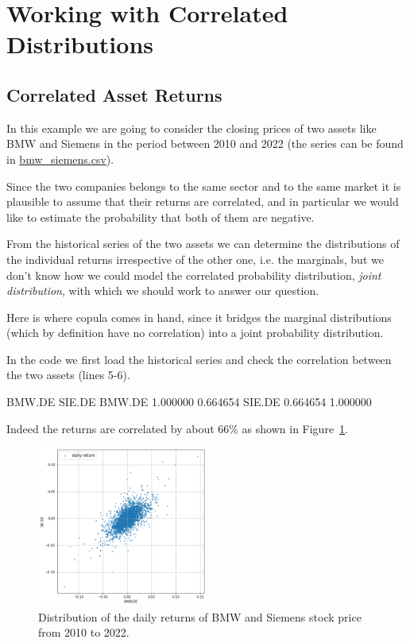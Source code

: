 \section{Working with Correlated Distributions}
\label{sec:generate-correlated-distributions}

\subsection{Correlated Asset Returns}
\label{sec:correlated_stock_returns}

In this example we are going to consider the closing prices of two assets like BMW and Siemens in the period between 2010 and 2022 (the series can be found in \href{https://github.com/matteosan1/finance_course/raw/master/input_files/bmw_siemens.csv}{bmw\_siemens.csv}).

Since the two companies belongs to the same sector and to the same market it is plausible to assume that their returns are correlated, and in particular we would like to estimate the probability that both of them are negative.

From the historical series of the two assets we can determine the distributions of the individual returns irrespective of the other one, i.e. the marginals, but we don't know how we could model the correlated probability distribution, \emph{joint distribution}, with which we should work to answer our question. 

Here is where copula comes in hand, since it bridges the marginal distributions (which by definition have no correlation) into a joint probability distribution. 


In the code we first load the historical series and check the correlation between the two assets (lines 5-6).
\begin{ioutput}
          BMW.DE    SIE.DE
BMW.DE  1.000000  0.664654
SIE.DE  0.664654  1.000000
\end{ioutput}
Indeed the returns are correlated by about 66\% as shown in Figure~\ref{fig:bmw_sie_returns}.

\begin{figure}[htbp]
\centering
\includegraphics[width=0.5\textwidth]{figures/bmw_sie_daily_returns}
\caption{Distribution of the daily returns of BMW and Siemens stock price from 2010 to 2022.}
\label{fig:bmw_sie_returns}
\end{figure}

